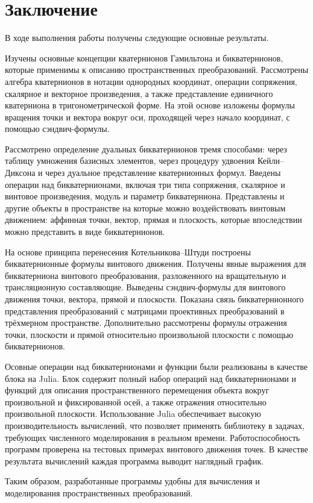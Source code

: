 \chapter{Заключение}


В ходе выполнения работы получены следующие основные результаты.

Изучены основные концепции кватернионов Гамильтона и бикватернионов, которые применимы к описанию пространственных преобразований. Рассмотрены алгебра кватернионов в нотации однородных координат, операции сопряжения, скалярное и векторное произведения, а также представление единичного кватерниона в тригонометрической форме. На этой основе изложены формулы вращения точки и вектора вокруг оси, проходящей через начало координат, с помощью сэндвич-формулы.

Рассмотрено определение дуальных бикватернионов тремя способами: через таблицу умножения базисных элементов, через процедуру удвоения Кейли–Диксона и через дуальное представление кватернионных формул. Введены операции над бикватернионами, включая три типа сопряжения, скалярное и винтовое произведения, модуль и параметр бикватерниона. Представлены и другие объекты в пространстве на которые можно воздействовать винтовым движением: аффинная точки, вектор, прямая и плоскость, которые впоследствии можно представить в виде бикватернионов.

На основе принципа перенесения Котельникова–Штуди построены бикватернионные формулы винтового движения. Получены явные выражения для бикватерниона винтового преобразования, разложенного на вращательную и трансляционную составляющие. Выведены сэндвич-формулы для винтового движения точки, вектора, прямой и плоскости. Показана связь бикватернионного представления преобразований с матрицами проективных преобразований в трёхмерном пространстве. Дополнительно рассмотрены формулы отражения точки, плоскости и прямой относительно произвольной плоскости с помощью бикватернионов.

Осовные операции над бикватернионами и функции были реализованы в качестве блока на Julia. Блок содержит полный набор операций над бикватернионами и функций для описания пространственного перемещения объекта вокруг произвольной и фиксированной осей, а также отражения относительно произвольной плоскости. Использование Julia обеспечивает высокую производительность вычислений, что позволяет применять библиотеку в задачах, требующих численного моделирования в реальном времени.
Работоспособность программ проверена на тестовых примерах винтового движения точек. В качестве результата вычислений каждая программа выводит наглядный график.

Таким образом, разработанные программы удобны для вычисления и моделирования пространственных преобразований. 

